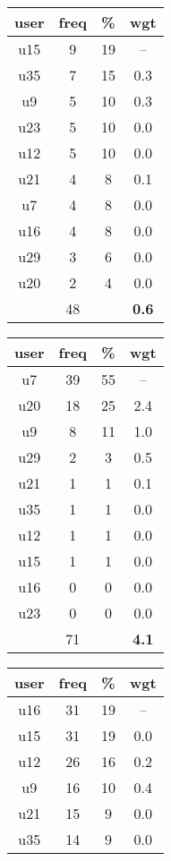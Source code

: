 \begin{appendices}
\begin{table}
\begin{tabular}{ |c|c|c|c| }
	\hline
\end{tabular}
\begin{tabular}{ |c|c|c|c| }
	\hline
	\textbf{user} & \textbf{freq} & \textbf{\%} & \textbf{wgt} \\
	\hline
	u15 & 9 & 19 & -- \\
	u35 & 7 & 15 & 0.3 \\
	u9 & 5 & 10 & 0.3 \\
	u23 & 5 & 10 & 0.0 \\
	u12 & 5 & 10 & 0.0 \\
	u21 & 4 & 8 & 0.1 \\
	u7 & 4 & 8 & 0.0 \\
	u16 & 4 & 8 & 0.0 \\
	u29 & 3 & 6 & 0.0 \\
	u20 & 2 & 4 & 0.0 \\
	 & 48 & & \textbf{0.6} \\
	\hline
\end{tabular}
\begin{tabular}{ |c|c|c|c| }
	\hline
	\textbf{user} & \textbf{freq} & \textbf{\%} & \textbf{wgt} \\
	\hline
	u7 & 39 & 55 & -- \\
	u20 & 18 & 25 & 2.4 \\
	u9 & 8 & 11 & 1.0 \\
	u29 & 2 & 3 & 0.5 \\
	u21 & 1 & 1 & 0.1 \\
	u35 & 1 & 1 & 0.0 \\
	u12 & 1 & 1 & 0.0 \\
	u15 & 1 & 1 & 0.0 \\
	u16 & 0 & 0 & 0.0 \\
	u23 & 0 & 0 & 0.0 \\
	 & 71 & & \textbf{4.1} \\
	\hline
\end{tabular}
\begin{tabular}{ |c|c|c|c| }
	\hline
	\textbf{user} & \textbf{freq} & \textbf{\%} & \textbf{wgt} \\
	\hline
	u16 & 31 & 19 & -- \\
	u15 & 31 & 19 & 0.0 \\
	u12 & 26 & 16 & 0.2 \\
	u9 & 16 & 10 & 0.4 \\
	u21 & 15 & 9 & 0.0 \\
	u35 & 14 & 9 & 0.0 \\

\end{tabular}
\end{table}
\end{appendices}

